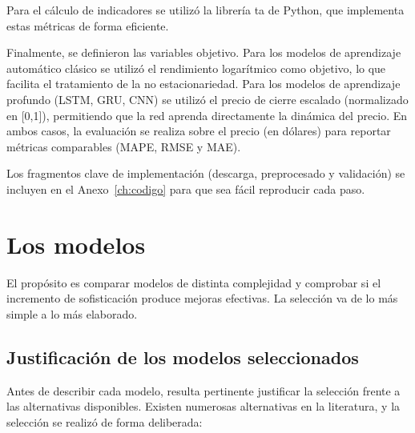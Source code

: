 Para el cálculo de indicadores se utilizó la librería ta de Python, que implementa estas métricas de forma eficiente.

Finalmente, se definieron las variables objetivo. Para los modelos de aprendizaje automático clásico se utilizó el rendimiento logarítmico como objetivo, lo que facilita el tratamiento de la no estacionariedad. Para los modelos de aprendizaje profundo (LSTM, GRU, CNN) se utilizó el precio de cierre escalado (normalizado en [0,1]), permitiendo que la red aprenda directamente la dinámica del precio. En ambos casos, la evaluación se realiza sobre el precio (en dólares) para reportar métricas comparables (MAPE, RMSE y MAE).

Los fragmentos clave de implementación (descarga, preprocesado y validación) se incluyen en el Anexo~\ref{ch:codigo} para que sea fácil reproducir cada paso.

\section{Los modelos}

El propósito es comparar modelos de distinta complejidad y comprobar si el incremento de sofisticación produce mejoras efectivas. La selección va de lo más simple a lo más elaborado.

\subsection{Justificación de los modelos seleccionados}

Antes de describir cada modelo, resulta pertinente justificar la selección frente a las alternativas disponibles. Existen numerosas alternativas en la literatura, y la selección se realizó de forma deliberada:

